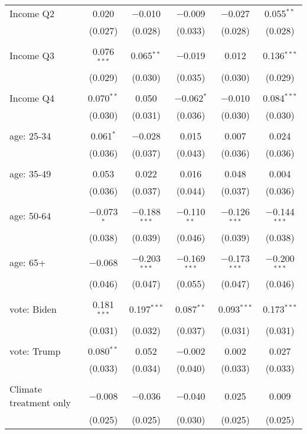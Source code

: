 \begin{tabular}{@{\extracolsep{5pt}}lccccc}
 Income Q2 & 0.020 & $-$0.010 & $-$0.009 & $-$0.027 & 0.055$^{**}$ \\ 
  & (0.027) & (0.028) & (0.033) & (0.028) & (0.028) \\ 
  & & & & & \\ 
 Income Q3 & 0.076$^{***}$ & 0.065$^{**}$ & $-$0.019 & 0.012 & 0.136$^{***}$ \\ 
  & (0.029) & (0.030) & (0.035) & (0.030) & (0.029) \\ 
  & & & & & \\ 
 Income Q4 & 0.070$^{**}$ & 0.050 & $-$0.062$^{*}$ & $-$0.010 & 0.084$^{***}$ \\ 
  & (0.030) & (0.031) & (0.036) & (0.030) & (0.030) \\ 
  & & & & & \\ 
 age: 25-34 & 0.061$^{*}$ & $-$0.028 & 0.015 & 0.007 & 0.024 \\ 
  & (0.036) & (0.037) & (0.043) & (0.036) & (0.036) \\ 
  & & & & & \\ 
 age: 35-49 & 0.053 & 0.022 & 0.016 & 0.048 & 0.004 \\ 
  & (0.036) & (0.037) & (0.044) & (0.037) & (0.036) \\ 
  & & & & & \\ 
 age: 50-64 & $-$0.073$^{*}$ & $-$0.188$^{***}$ & $-$0.110$^{**}$ & $-$0.126$^{***}$ & $-$0.144$^{***}$ \\ 
  & (0.038) & (0.039) & (0.046) & (0.039) & (0.038) \\ 
  & & & & & \\ 
 age: 65+ & $-$0.068 & $-$0.203$^{***}$ & $-$0.169$^{***}$ & $-$0.173$^{***}$ & $-$0.200$^{***}$ \\ 
  & (0.046) & (0.047) & (0.055) & (0.047) & (0.046) \\ 
  & & & & & \\ 
 vote: Biden & 0.181$^{***}$ & 0.197$^{***}$ & 0.087$^{**}$ & 0.093$^{***}$ & 0.173$^{***}$ \\ 
  & (0.031) & (0.032) & (0.037) & (0.031) & (0.031) \\ 
  & & & & & \\ 
 vote: Trump & 0.080$^{**}$ & 0.052 & $-$0.002 & 0.002 & 0.027 \\ 
  & (0.033) & (0.034) & (0.040) & (0.033) & (0.033) \\ 
  & & & & & \\ 
 Climate treatment only & $-$0.008 & $-$0.036 & $-$0.040 & 0.025 & 0.009 \\ 
  & (0.025) & (0.025) & (0.030) & (0.025) & (0.025) \\ 

\end{tabular}
